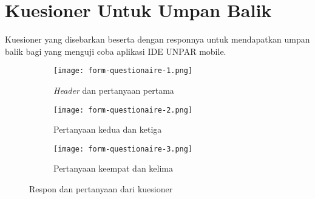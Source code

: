 \chapter{Kuesioner Untuk Umpan Balik}
\label{lamp:B}

\def\scl{1}
\def\leg{} 
\def\std{none}
\def\ymin{}
\def\ymax{}

Kuesioner yang disebarkan beserta dengan responnya untuk mendapatkan umpan balik bagi yang menguji coba aplikasi IDE UNPAR mobile.

\begin{figure}[H] 
	\centering  
	\begin{subfigure}{.3\textwidth}
	\centering
	\texttt{[image: form-questionaire-1.png]}
	\caption{\textit{Header} dan pertanyaan pertama}
	\end{subfigure}  
	\hfill
	\begin{subfigure}{.3\textwidth}
	\centering
	\texttt{[image: form-questionaire-2.png]}
	\caption{Pertanyaan kedua dan ketiga}
	\end{subfigure}
	\hfill  
	\begin{subfigure}{.3\textwidth}
	\centering
	\texttt{[image: form-questionaire-3.png]}
	\caption{Pertanyaan keempat dan kelima}
	\end{subfigure}  
	\caption[Respon dan pertanyaan dari kuesioner] {Respon dan pertanyaan dari kuesioner}
	\label{fig:questionaire} 
\end{figure} 
